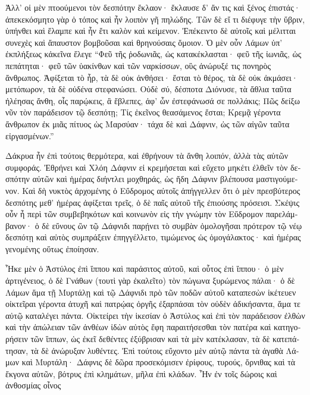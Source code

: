 \documentclass{book}
\begin{document}
\begin{pairs}
\begin{Leftside}
\begin{greek}
  Ἀλλ’ οἱ μὲν πτοούμενοι τὸν δεσπότην ἔκλαον· ἔκλαυσε δ’ ἄν τις καὶ ξένος ἐπιστάς· ἀπεκεκόσμητο γὰρ ὁ τόπος καὶ ἦν λοιπὸν γῆ πηλώδης. Τῶν δὲ εἴ τι διέφυγε τὴν ὕβριν, ὑπήνθει καὶ ἔλαμπε καὶ ἦν ἔτι καλὸν καὶ κείμενον.  Ἐπέκειντο δὲ αὐτοῖς καὶ μέλιτται συνεχὲς καὶ ἄπαυστον βομβοῦσαι καὶ θρηνούσαις ὅμοιον. Ὁ μὲν οὖν Λάμων ὑπ’ ἐκπλήξεως κἀκεῖνα ἔλεγε “Φεῦ τῆς ῥοδωνιᾶς, ὡς κατακέκλασται·  φεῦ τῆς ἰωνιᾶς, ὡς πεπάτηται· φεῦ τῶν ὑακίνθων καὶ τῶν ναρκίσσων, οὓς ἀνώρυξέ τις πονηρὸς ἄνθρωπος. Ἀφίξεται τὸ ἦρ, τὰ δὲ οὐκ ἀνθήσει· ἔσται τὸ θέρος, τὰ δὲ οὐκ ἀκμάσει· μετόπωρον, τὰ δὲ οὐδένα στεφανώσει.  Οὐδὲ σύ, δέσποτα Διόνυσε, τὰ ἄθλια ταῦτα ἠλέησας ἄνθη, οἷς παρῴκεις, ἃ ἔβλεπες, ἀφ’ ὧν ἐστεφάνωσά σε πολλάκις; Πῶς δείξω νῦν τὸν παράδεισον τῷ δεσπότῃ; Τίς ἐκεῖνος θεασάμενος ἔσται; Κρεμᾷ γέροντα ἄνθρωπον ἐκ μιᾶς πίτυος ὡς Μαρσύαν· τάχα δὲ καὶ Δάφνιν, ὡς τῶν αἰγῶν ταῦτα εἰργασμένων.”
\pend


  Δάκρυα ἦν ἐπὶ τούτοις θερμότερα, καὶ ἐθρήνουν τὰ ἄνθη λοιπόν, ἀλλὰ τὰς αὑτῶν συμφοράς. Ἐθρήνει καὶ Χλόη Δάφνιν εἰ κρεμήσεται καὶ εὔχετο μηκέτι ἐλθεῖν τὸν δεσπότην αὐτῶν καὶ ἡμέρας διήντλει μοχθηράς, ὡς ἤδη Δάφνιν βλέπουσα μαστιγούμενον.  Καὶ δὴ νυκτὸς ἀρχομένης ὁ Εὔδρομος αὐτοῖς ἀπήγγελλεν ὅτι ὁ μὲν πρεσβύτερος δεσπότης μεθ’ ἡμέρας ἀφίξεται τρεῖς, ὁ δὲ παῖς αὐτοῦ τῆς ἐπιούσης πρόσεισι.  Σκέψις οὖν ἦ περὶ τῶν συμβεβηκότων καὶ κοινωνὸν εἰς τὴν γνώμην τὸν Εὔδρομον παρελάμβανον· ὁ δὲ εὔνους ὢν τῷ Δάφνιδι παρῄνει τὸ συμβὰν ὁμολογῆσαι πρότερον τῷ νέῳ δεσπότῃ καὶ αὐτὸς συμπράξειν ἐπηγγέλλετο, τιμώμενος ὡς ὁμογάλακτος· καὶ ἡμέρας γενομένης οὕτως ἐποίησαν.
\pend


  Ἧκε μὲν ὁ Ἀστύλος ἐπὶ ἵππου καὶ παράσιτος αὐτοῦ, καὶ οὗτος ἐπὶ ἵππου· ὁ μὲν ἀρτιγένειος, ὁ δὲ Γνάθων (τουτὶ γὰρ ἐκαλεῖτο) τὸν πώγωνα ξυρώμενος πάλαι· ὁ δὲ Λάμων ἅμα τῇ Μυρτάλῃ καὶ τῷ Δάφνιδι πρὸ τῶν ποδῶν αὐτοῦ καταπεσὼν ἱκέτευεν οἰκτεῖραι γέροντα ἀτυχῆ καὶ πατρῴας ὀργῆς ἐξαρπάσαι τὸν οὐδὲν ἀδικήσαντα, ἅμα τε αὐτῷ καταλέγει πάντα.  Οἰκτείρει τὴν ἱκεσίαν ὁ Ἀστύλος καὶ ἐπὶ τὸν παράδεισον ἐλθὼν καὶ τὴν ἀπώλειαν τῶν ἀνθέων ἰδὼν αὐτὸς ἔφη παραιτήσεσθαι τὸν πατέρα καὶ κατηγορήσειν τῶν ἵππων, ὡς ἐκεῖ δεθέντες ἐξύβρισαν καὶ τὰ μὲν κατέκλασαν, τὰ δὲ κατεπάτησαν, τὰ δὲ ἀνώρυξαν λυθέντες.  Ἐπὶ τούτοις εὔχοντο μὲν αὐτῷ πάντα τὰ ἀγαθὰ Λάμων καὶ Μυρτάλη· Δάφνις δὲ δῶρα προσεκόμισεν ἐρίφους, τυρούς, ὄρνιθας καὶ τὰ ἔκγονα αὐτῶν, βότρυς ἐπὶ κλημάτων, μῆλα ἐπὶ κλάδων. Ἦν ἐν τοῖς δώροις καὶ ἀνθοσμίας οἶνος
\pend



\end{greek}
\end{Leftside}
\end{pairs}
\end{document}
